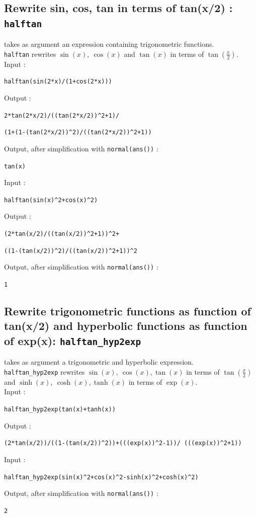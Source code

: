 \documentclass[a4paper,11pt]{book}
\begin{document}
\subsection{Rewrite sin, cos, tan in terms of tan(x/2) : {\tt halftan}}
 takes as argument an expression 
containing trigonometric functions.\\
{\tt halftan} rewrites $\sin(x),\ \cos(x)$ and  $ \tan(x)$ 
 in terms of $\tan(\frac{x}{2})$.\\
Input :
\begin{center}{\tt halftan(sin(2*x)/(1+cos(2*x)))}\end{center}
Output :
\begin{center}{\tt 2*tan(2*x/2)/((tan(2*x/2))\verb|^|2+1)/}\end{center}
\begin{center}{\tt (1+(1-(tan(2*x/2))\verb|^|2)/((tan(2*x/2))\verb|^|2+1))}\end{center}
Output, after simplification with {\tt normal(ans())} :
\begin{center}{\tt tan(x)}\end{center}
Input :
\begin{center}{\tt halftan(sin(x)\verb|^|2+cos(x)\verb|^|2)}\end{center}
Output :
\begin{center}{\tt (2*tan(x/2)/((tan(x/2))\verb|^|2+1))\verb|^|2+}\end{center}
\begin{center}{\tt ((1-(tan(x/2))\verb|^|2)/((tan(x/2))\verb|^|2+1))\verb|^|2}\end{center}
Output, after simplification with {\tt normal(ans())} :
\begin{center}{\tt 1}\end{center}

\subsection{Rewrite trigonometric functions as function of tan(x/2) 
and hyperbolic functions as function of exp(x):
{\tt halftan\_hyp2exp}}
 takes as argument a trigonometric and  
hyperbolic expression.\\
{\tt halftan\_hyp2exp} rewrites $\sin(x),\ \cos(x), \tan(x)$ 
 in terms of $\tan(\frac{x}{2})$ 
and $\sinh(x),\ \cosh(x), \tanh(x)$ in terms of $\exp(x)$.\\
Input :
\begin{center}{\tt halftan\_hyp2exp(tan(x)+tanh(x))}\end{center}
Output :
\begin{center}{\tt (2*tan(x/2))/((1-(tan(x/2))\verb|^|2))+(((exp(x))\verb|^|2-1))/ (((exp(x))\verb|^|2+1))}\end{center}
Input :
\begin{center}{\tt halftan\_hyp2exp(sin(x)\verb|^|2+cos(x)\verb|^|2-sinh(x)\verb|^|2+cosh(x)\verb|^|2)}\end{center}
Output, after simplification with {\tt normal(ans())} :
\begin{center}{\tt 2}\end{center}
\end{document}
